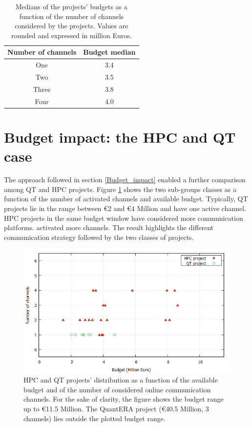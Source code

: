 \begin{table}[t]
 \begin{center}
  \begin{tabular}{cc}
   \hline 
   \hline
   Number of channels & Budget median \\ 
   \hline
   \hline
   One & 3.4 \\
   Two & 3.5 \\
   Three & 3.8 \\
   Four & 4.0 \\
   \hline
   \hline
  \end{tabular}
 \end{center} 
 \caption{Medians of the projects' budgets as a function of the number of channels considered by the projects. Values are rounded and expressed in million Euros.}
\label{Median} 
\end{table}

\section{Budget impact: the HPC and QT case} \label{Budget_impact_the_HPC_and_QT_case}
The approach followed in section \ref{Budget_impact} enabled a further comparison among QT and HPC projects. Figure \ref{Channel_budget_breakdown} shows the two sub-groups classes as a function of the number of activated channels and available budget. Typically, QT projects lie in the range between \euro 2 and \euro 4 Million and have one active channel. HPC projects in the same budget window have considered more communication platforms.  activated more channels. The result highlights the different communication strategy followed by the two classes of projects. 

\begin{figure}[!t] 
 \begin{center}
 \includegraphics[scale=0.4]{Images/Channel_budget_breakdown.png}
 \caption{HPC and QT projects' distribution as a function of the available budget and of the number of considered online communication channels. For the sake of clarity, the figure shows the budget range up to \euro 11.5 Million. The QuantERA project (\euro 40.5 Million, 3 channels) lies outside the plotted budget range.}
 \label{Channel_budget_breakdown}
 \end{center}
\end{figure}

